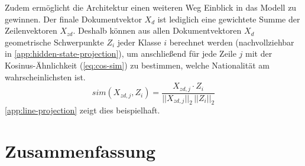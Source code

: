 \documentclass[bachelor,german]{info1thesis}
\begin{document}
%
%
%
Zudem ermöglicht die Architektur einen weiteren Weg Einblick in das Modell zu gewinnen. Der finale Dokumentvektor $X_d$ ist lediglich eine gewichtete Summe der Zeilenvektoren $X_{zd}$. Deshalb können aus allen Dokumentvektoren $X_d$ geometrische Schwerpunkte $Z_i$ jeder Klasse $i$ berechnet werden (nachvollziehbar in \autoref{app:hidden-state-projection}), um anschließend für jede Zeile $j$ mit der Kosinus-Ähnlichkeit (\autoref{eq:cos-sim}) zu bestimmen, welche Nationalität am wahrscheinlichsten ist.
\begin{equation}
sim(X_{zd,j}, Z_i) = \frac{X_{zd,j} \cdot Z_i}{||X_{zd,j}||_2\,||Z_i||_2} \label{eq:cos-sim}
\end{equation}
\autoref{app:line-projection} zeigt dies beispielhaft.

\chapter{Zusammenfassung}
\end{document}
